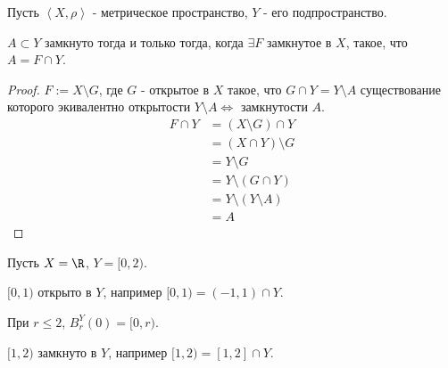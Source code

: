\begin{theorem} \thmslashn

    Пусть $\left<X, \rho\right>$ - метрическое пространство, $Y$ - его подпространство.

    $A \subset Y$ замкнуто тогда и только тогда, когда $\exists{F}$ замкнутое в $X$, такое, что $A = F\cap Y$.
    \begin{proof} \thmslashn
    
        $F := X \setminus G$, где $G$ - открытое в  $X$ такое, что  $G\cap Y = Y \setminus A$ существование которого экивалентно открытости $Y \setminus A \iff $ замкнутости $A$.
        \begin{equation*}
            \begin{split}
                F\cap Y 
                &= (X \setminus G)\cap Y\\
                &= (X\cap Y) \setminus G\\
                &= Y \setminus G\\
                &= Y \setminus (G\cap Y)\\
                &= Y \setminus (Y \setminus A)\\
                &= A
            \end{split}
        \end{equation*}
    \end{proof}
\end{theorem}
\begin{example} \thmslashn

    Пусть $X = \R$, $Y = [0, 2)$.

    $[0, 1)$ открыто в $Y$, например $[0, 1) = (-1, 1)\cap Y$.

    При $r \le 2$, $B_{r}^{Y}(0) = [0, r)$.

    $[1, 2)$ замкнуто в $Y$, например $[1, 2) = [1, 2]\cap Y$.
\end{example}
